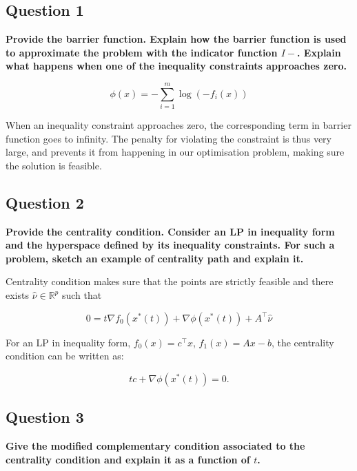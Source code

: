 \subsection*{Question 1}
\textbf{Provide the barrier function. Explain how the barrier function is used to approximate the problem with the indicator function $I-$. Explain what happens when one of the inequality constraints approaches zero.}

$$
\phi(x) = -\sum_{i=1}^m \log(- f_i(x))
$$

When an inequality constraint approaches zero, the corresponding term in barrier function goes to infinity. The penalty for violating the constraint is thus very large, and prevents it from happening in our optimisation problem, making sure the solution is feasible.

\subsection*{Question 2}
\textbf{Provide the centrality condition. Consider an LP in inequality form and the hyperspace deﬁned by its inequality constraints. For such a problem, sketch an example of centrality path and explain it.}

Centrality condition makes sure that the points are strictly feasible and there exists $\hat \nu \in \mathbb{R}^p$ such that

$$
0 = t \nabla f_0(x^*(t)) + \nabla \phi(x^*(t)) + A^\top \hat \nu
$$

For an LP in inequality form, $f_0(x) = c^\top x$, $f_1(x) = Ax-b$, the centrality condition can be written as: 

$$
t c + \nabla \phi(x^*(t)) = 0.
$$



\subsection*{Question 3}
\textbf{Give the modiﬁed complementary condition associated to the centrality condition and explain it as a function of $t$.}

